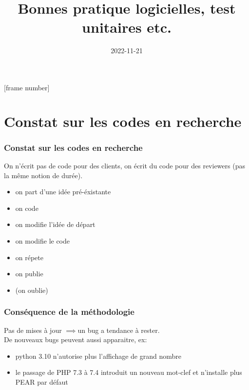 \documentclass{beamer}
\institute{Inria Rennes}
\date{\displaydate{date}}
\date{2022-11-21}
\title[Bonnes pratique logicielles, test unitaires etc.]{Bonnes pratique logicielles, test unitaires etc.}
\begin{document}
[frame number]
\frame{\titlepage}



\section{Constat sur les codes en recherche}
\begin{frame}
    \frametitle{Constat sur les codes en recherche}
    On n'écrit pas de code pour des clients, on écrit du code pour des reviewers (pas la même notion de durée).\\
    \begin{itemize}
        \item on part d'une idée pré-éxistante
        \item on code
        \item on modifie l'idée de départ
        \item on modifie le code
        \item on répete
        \item on publie
        \item (on oublie)
    \end{itemize}
\end{frame}


\begin{frame}
    \frametitle{Conséquence de la méthodologie}
    Pas de mises à jour $\implies $un bug a tendance à rester.\\

    De nouveaux bugs peuvent aussi apparaitre, ex:%

    \begin{itemize}
        \item python 3.10 n'autorise plus l'affichage de grand nombre
        \item le passage de PHP 7.3 à 7.4 introduit un nouveau mot-clef et n'installe plus PEAR par défaut
    \end{itemize}
\end{frame}
\end{document}
